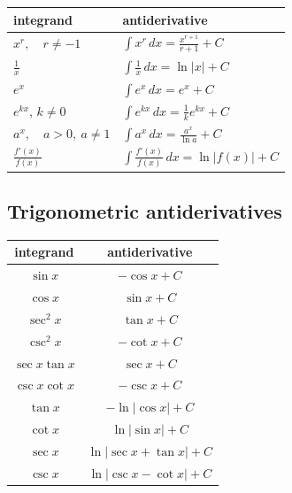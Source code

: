 \begin{center}
\renewcommand{\arraystretch}{2.0}
\begin{tabular}{p{}|p{}}
\textbf{integrand} & \textbf{antiderivative} \\ \hline

\(\displaystyle x^r,\quad r\neq -1\) &
\(\displaystyle \int x^r\,dx=\frac{x^{r+1}}{r+1}+C\) \\

\(\displaystyle \frac1x\) &
\(\displaystyle \int \frac1x\,dx=\ln|x|+C\) \\

\(\displaystyle e^x\) &
\(\displaystyle \int e^x\,dx=e^x+C\) \\

\(\displaystyle e^{kx}\), \(k\neq0\) &
\(\displaystyle \int e^{kx}\,dx=\frac1k e^{kx}+C\) \\

\(\displaystyle a^x,\quad a>0,\ a\neq1\) &
\(\displaystyle \int a^x\,dx=\frac{a^x}{\ln a}+C\) \\

\(\displaystyle \frac{f'(x)}{f(x)}\) &
\(\displaystyle \int \frac{f'(x)}{f(x)}\,dx=\ln|f(x)|+C\)
\end{tabular}
\end{center}

\subsection{Trigonometric antiderivatives}
\label{appsubsec:trig-antiderivatives}

\begin{center}
\renewcommand{\arraystretch}{1.8}
\begin{tabular}{c|c}
\textbf{integrand} & \textbf{antiderivative} \\ \hline
\(\sin x\) & \(-\cos x+C\) \\
\(\cos x\) & \(\sin x+C\) \\
\(\sec^2 x\) & \(\tan x+C\) \\
\(\csc^2 x\) & \(-\cot x+C\) \\
\(\sec x\tan x\) & \(\sec x+C\) \\
\(\csc x\cot x\) & \(-\csc x+C\) \\
\(\tan x\) & \(-\ln|\cos x|+C\) \\
\(\cot x\) & \(\ln|\sin x|+C\) \\
\(\sec x\) & \(\ln|\sec x+\tan x|+C\) \\
\(\csc x\) & \(\ln|\csc x-\cot x|+C\)
\end{tabular}
\end{center}

